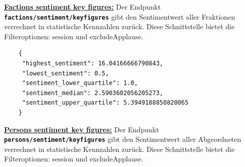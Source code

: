\textbf{\underline{Factions sentiment key figures:}} \newline
Der Endpunkt \textbf{\texttt{factions/sentiment/keyfigures}} gibt den Sentimentwert aller Fraktionen verrechnet in statistische Kennzahlen zurück. Diese Schnittstelle bietet die Filteroptionen: session und excludeApplause.	
\begin{lstlisting}
	{
	 "highest_sentiment": 16.04166666790843, 
	 "lowest_sentiment": 0.5, 
	 "sentiment_lower_quartile": 1.0, 
	 "sentiment_median": 2.5903602056205273, 
	 "sentiment_upper_quartile": 5.3949188850820065
	}
\end{lstlisting}	
\textbf{\underline{Persons sentiment key figures:}} \newline
Der Endpunkt \textbf{\texttt{persons/sentiment/keyfigures}} gibt den Sentimentwert aller Abgeordneten verrechnet in statistische Kennzahlen zurück. Diese Schnittstelle bietet die Filteroptionen: session und excludeApplause.